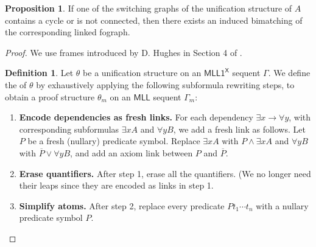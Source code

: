 \documentclass[conference,twosided,10pt]{IEEEtran}
\theoremstyle{definition}
\newtheorem{definition}[thm]{Definition}
\newtheorem{proposition}[thm]{Proposition}
\newcommand*{\MLL}{\mathsf{MLL}}
\newcommand*{\FOMLL}{\mathsf{MLL1^X}}
\newcommand{\cor}{\vee}
\newcommand{\cand}{\wedge}
\begin{document}
\begin{proposition}
If one of the switching graphs of the unification structure of $A$
contains a cycle or is not connected, then there exists an induced bimatching of the
corresponding linked fograph.
\begin{proof}
We use frames introduced by D. Hughes in Section 4 of \cite{hughes:unifn}.

\begin{definition}
Let $\theta$ be a unification structure on an $\FOMLL$ sequent $\Gamma$.
We define the   of $\theta$ by exhaustively applying the following subformula rewriting steps, to obtain a proof structure $\theta_m$ on an $\MLL$ sequent $\Gamma_m$:

\begin{enumerate}
  \item {\bf Encode dependencies as fresh links.} For each dependency $\exists x
	  \rightarrow \forall y$, with corresponding subformulas $\exists x A$
		and $\forall y B$, we add a fresh link as follows. Let $P$ be a
		fresh (nullary) predicate symbol. Replace $\exists x A$ with $P
		\cand \exists x A$ and $\forall y B$ with $\overline{P} \cor \forall y B$, and add an axiom link between $P$ and $\overline{P}$.
  \item {\bf Erase quantifiers.} After step 1, erase all the quantifiers. (We no longer need their leaps since they are encoded as links in step 1.
  \item {\bf Simplify atoms.} After step 2, replace every predicate $Pt_1 \cdots t_n$ with a nullary predicate symbol $P$.
\end{enumerate}
\end{definition}

\begin{figure}
\begin{center}
\vspace{1.5ex}


\end{center}
\end{figure}
\end{proof}
\end{proposition}
\end{document}
